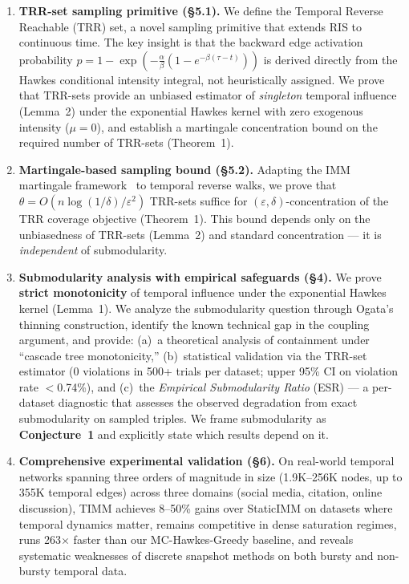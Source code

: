 \documentclass[10pt,conference]{IEEEtran}
\newcommand{\tiimm}{TIMM\xspace}
\begin{document}
\begin{enumerate}
\item \textbf{TRR-set sampling primitive (\S5.1).}
We define the Temporal Reverse Reachable (TRR) set, a novel sampling primitive that extends RIS to continuous time.
The key insight is that the backward edge activation probability
$p = 1 - \exp(-\frac{\alpha}{\beta}(1 - e^{-\beta(\tau-t)}))$ 
is derived directly from the Hawkes conditional intensity integral, not heuristically assigned.
We prove that TRR-sets provide an unbiased estimator of \emph{singleton} temporal influence (Lemma~2) under the exponential Hawkes kernel with zero exogenous intensity ($\mu=0$), and establish a martingale concentration bound on the required number of TRR-sets (Theorem~1).

\item \textbf{Martingale-based sampling bound (\S5.2).}
Adapting the IMM martingale framework~\cite{tang2015} to temporal reverse walks, we prove that
$\theta = O(n \log(1/\delta) / \varepsilon^2)$ TRR-sets suffice for $(\varepsilon,\delta)$-concentration of the TRR coverage objective (Theorem~1).
This bound depends only on the unbiasedness of TRR-sets (Lemma~2) and standard concentration — it is \emph{independent} of submodularity.

\item \textbf{Submodularity analysis with empirical safeguards (\S4).}
We prove \textbf{strict monotonicity} of temporal influence under the exponential Hawkes kernel (Lemma~1).
We analyze the submodularity question through Ogata's thinning construction, identify the known technical gap in the coupling argument, and provide:
(a)~a theoretical analysis of containment under ``cascade tree monotonicity,''
(b)~statistical validation via the TRR-set estimator (0 violations in 500+ trials per dataset; upper 95\% CI on violation rate $<$0.74\%),
and (c)~the \emph{Empirical Submodularity Ratio} (ESR) — a per-dataset diagnostic that assesses the observed degradation from exact submodularity on sampled triples.
We frame submodularity as \textbf{Conjecture~1} and explicitly state which results depend on it.

\item \textbf{Comprehensive experimental validation (\S6).}
On real-world temporal networks spanning three orders of magnitude in size (1.9K--256K nodes, up to 355K temporal edges) across three domains (social media, citation, online discussion),
\tiimm{} achieves 8--50\% gains over StaticIMM on datasets where temporal dynamics matter, remains competitive in dense saturation regimes, runs 263$\times$ faster than our MC-Hawkes-Greedy baseline, and reveals systematic weaknesses of discrete snapshot methods on both bursty and non-bursty temporal data.
\end{enumerate}
\end{document}
